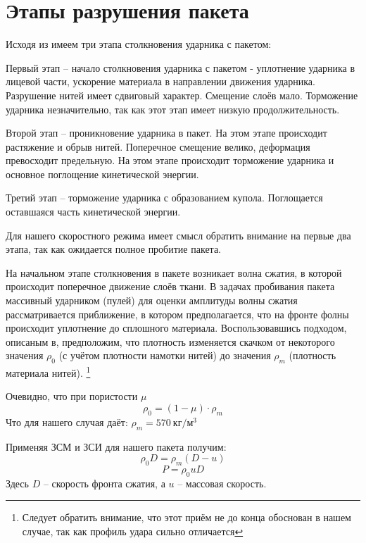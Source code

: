\section*{Этапы разрушения пакета}
Исходя из\cite{kobylkin2014} имеем три этапа столкновения ударника с пакетом:

Первый этап -- начало столкновения ударника с пакетом - уплотнение ударника в лицевой части,
ускорение материала в направлении движения ударника.
Разрушение нитей имеет сдвиговый характер.
Смещение слоёв мало.
Торможение ударника незначительно, так как этот этап имеет низкую продолжительность.

Второй этап -- проникновение ударника в пакет.
На этом этапе происходит растяжение и обрыв нитей.
Поперечное смещение велико, деформация превосходит предельную.
На этом этапе происходит торможение ударника и основное поглощение кинетической энергии.

Третий этап -- торможение ударника с образованием купола.
Поглощается оставшаяся часть кинетической энергии.

Для нашего скоростного режима имеет смысл обратить внимание на первые два этапа, так как ожидается полное пробитие пакета.

На начальном этапе столкновения в пакете возникает волна сжатия, в которой происходит поперечное движение слоёв ткани.
В задачах пробивания пакета массивный ударником (пулей) для оценки амплитуды волны сжатия рассматривается приближение,
в котором предполагается, что на фронте фолны происходит уплотнение до сплошного материала.
Воспользовавшись подходом, описаным в\cite{kobylkin2014}, предположим, что плотность изменяется скачком от некоторого
значения $\rho_0$ (с учётом плотности намотки нитей) до значения $\rho_m$ (плотность материала нитей).
\footnote{Следует обратить внимание, что этот приём не до конца обоснован в нашем случае, так как профиль удара сильно
отличается}

Очевидно, что при пористости $\mu$
\begin{equation}
    \rho_0 = (1 - \mu) \cdot \rho_m
\end{equation}
Что для нашего случая даёт: $\rho_m = 570~кг / м^3$

Применяя ЗСМ и ЗСИ для нашего пакета получим:
\begin{equation}
    \rho_0 D = \rho_m (D - u)
\end{equation}
\begin{equation}
    P = \rho_0 u D
\end{equation}
Здесь $D$ -- скорость фронта сжатия, а $u$ -- массовая скорость.

